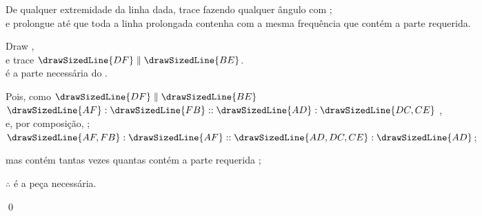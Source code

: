 \documentclass[booklanguage=brazilian]{byrnebook}
\begin{document}
\begin{center}
De qualquer extremidade da linha dada, trace  fazendo qualquer ângulo com ;\\
e prolongue  até que toda a linha prolongada  contenha  com a mesma frequência que  contém a parte requerida.

Draw ,\\
e trace $\drawSizedLine{DF} \parallel \drawSizedLine{BE}$.\\

 é a parte necessária do .

Pois, como $\drawSizedLine{DF} \parallel \drawSizedLine{BE}$\\
$\drawSizedLine{AF} : \drawSizedLine{FB} :: \drawSizedLine{AD} : \drawSizedLine{DC,CE}$ ,\\
e, por composição, ;\\
$\drawSizedLine{AF,FB} : \drawSizedLine{AF} :: \drawSizedLine{AD,DC,CE} : \drawSizedLine{AD}$;

mas  contém  tantas vezes quantas  contém a parte requerida \byref{\constref};

$\therefore$  é a peça necessária.
\end{center}

\qed
\end{document}
